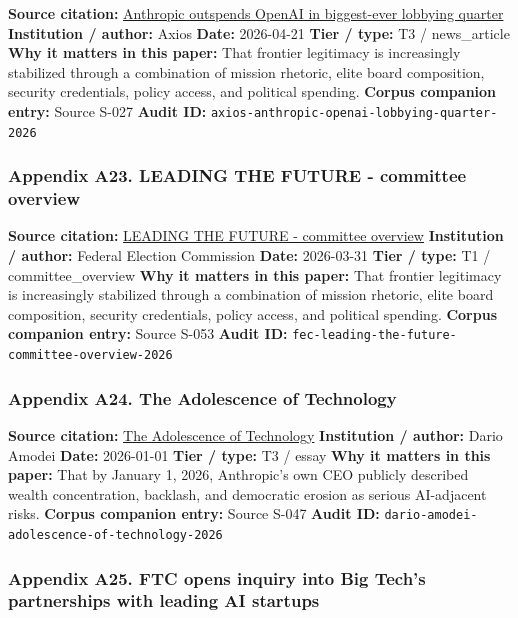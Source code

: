 \documentclass[
  american,
  11pt,
  letterpaper,
]{article}
\begin{document}
\textbf{Source citation:}
\href{https://www.axios.com/2026/04/21/anthropic-outspends-openai-biggest-lobbying-quarter}{Anthropic
outspends OpenAI in biggest-ever lobbying quarter} \textbf{Institution /
author:} Axios \textbf{Date:} 2026-04-21 \textbf{Tier / type:} T3 /
news\_article \textbf{Why it matters in this paper:} That frontier
legitimacy is increasingly stabilized through a combination of mission
rhetoric, elite board composition, security credentials, policy access,
and political spending. \textbf{Corpus companion entry:} Source S-027
\textbf{Audit ID:} \texttt{axios-anthropic-openai-lobbying-quarter-2026}

\subsubsection{Appendix A23. LEADING THE FUTURE - committee
overview}\label{ch-10-appendix-a23-leading-the-future-committee-overview}

\textbf{Source citation:}
\href{https://www.fec.gov/data/committee/C00916114/}{LEADING THE FUTURE
- committee overview} \textbf{Institution / author:} Federal Election
Commission \textbf{Date:} 2026-03-31 \textbf{Tier / type:} T1 /
committee\_overview \textbf{Why it matters in this paper:} That frontier
legitimacy is increasingly stabilized through a combination of mission
rhetoric, elite board composition, security credentials, policy access,
and political spending. \textbf{Corpus companion entry:} Source S-053
\textbf{Audit ID:}
\texttt{fec-leading-the-future-committee-overview-2026}

\subsubsection{Appendix A24. The Adolescence of
Technology}\label{ch-10-appendix-a24-the-adolescence-of-technology}

\textbf{Source citation:}
\href{https://darioamodei.com/essay/the-adolescence-of-technology}{The
Adolescence of Technology} \textbf{Institution / author:} Dario Amodei
\textbf{Date:} 2026-01-01 \textbf{Tier / type:} T3 / essay \textbf{Why
it matters in this paper:} That by January 1, 2026, Anthropic's own CEO
publicly described wealth concentration, backlash, and democratic
erosion as serious AI-adjacent risks. \textbf{Corpus companion entry:}
Source S-047 \textbf{Audit ID:}
\texttt{dario-amodei-adolescence-of-technology-2026}

\subsubsection{Appendix A25. FTC opens inquiry into Big Tech's
partnerships with leading AI
startups}\label{ch-10-appendix-a25-ftc-opens-inquiry-into-big-tech-s-partnerships-with-leading-ai-startups}
\end{document}
